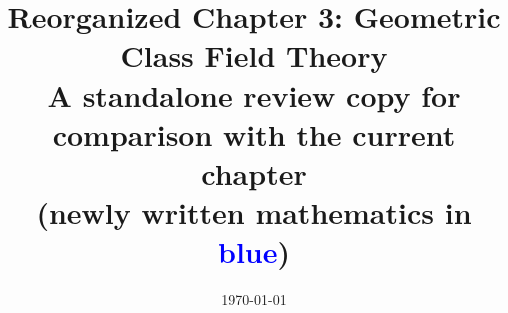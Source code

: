 
\newenvironment{bluemath}{\par\begingroup\color{blue}}{\endgroup\par}

\usepackage{xr}


\title{Reorganized Chapter 3: Geometric Class Field Theory\\
\large A standalone review copy for comparison with the current chapter\\
\large (newly written mathematics in \textcolor{blue}{blue})}
\author{}
\date{\today}


\maketitle
\tableofcontents

\setcounter{chapter}{2}



\printbibliography



